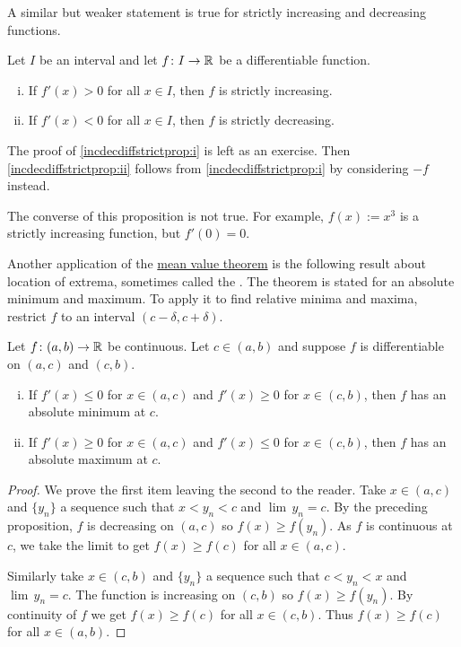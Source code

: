 A similar but weaker statement is true for strictly increasing and
decreasing functions.

\begin{prop} \label{incdecdiffstrictprop}
Let $I$ be an interval and
let $f \colon I \to {\mathbb{R}}$ be a differentiable function.
\begin{enumerate}[(i)]
\item
\label{incdecdiffstrictprop:i}
If $f'(x) > 0$ for all $x \in I$, then
$f$ is strictly increasing.
\item
\label{incdecdiffstrictprop:ii}
If $f'(x) < 0$ for all $x \in I$,
then $f$ is strictly decreasing.
\end{enumerate}
\end{prop}

The proof of
\ref{incdecdiffstrictprop:i}
is left as an exercise.
Then \ref{incdecdiffstrictprop:ii}
follows from 
\ref{incdecdiffstrictprop:i} by considering $-f$
instead.

The converse of this proposition is not true.  For example,
$f(x) := x^3$ is a strictly increasing function, but $f'(0) = 0$.

\medskip

Another application of the \hyperref[thm:mvt]{mean value theorem} is the following result about
location of extrema, sometimes called the \emph{}.  The theorem is stated for an absolute minimum and
maximum. To apply it to find relative minima
and maxima, restrict $f$ to an interval $(c-\delta,c+\delta)$.

\begin{prop} \label{firstderminmaxtest}
Let $f \colon (a,b) \to {\mathbb{R}}$ be continuous.  Let $c \in (a,b)$
and suppose
$f$ is differentiable on $(a,c)$ and $(c,b)$.
\begin{enumerate}[(i)]
\item If $f'(x) \leq 0$ for $x \in (a,c)$ and
 $f'(x) \geq 0$ for $x \in (c,b)$, then $f$ has an absolute minimum 
at $c$.
\item If $f'(x) \geq 0$ for $x \in (a,c)$ and
 $f'(x) \leq 0$ for $x \in (c,b)$, then $f$ has an absolute maximum
at $c$.
\end{enumerate}
\end{prop}

\begin{proof}
We prove the first item leaving the second to the reader.
Take $x \in (a,c)$
and $\{ y_n\}$ a sequence such that $x < y_n < c$ and $\lim\, y_n = c$.
By the preceding proposition,
$f$ is decreasing on $(a,c)$ so $f(x) \geq f(y_n)$.
As $f$ is
continuous at $c$, we take the limit to get
$f(x) \geq f(c)$ for all $x \in (a,c)$.

Similarly take $x \in (c,b)$
and $\{ y_n\}$ a sequence such that $c < y_n < x$ and $\lim\, y_n = c$.
The function is increasing on $(c,b)$ so $f(x) \geq f(y_n)$.
By continuity of $f$ we get
$f(x) \geq f(c)$ for all $x \in (c,b)$.  Thus $f(x) \geq f(c)$ for all
$x \in (a,b)$.
\end{proof}

